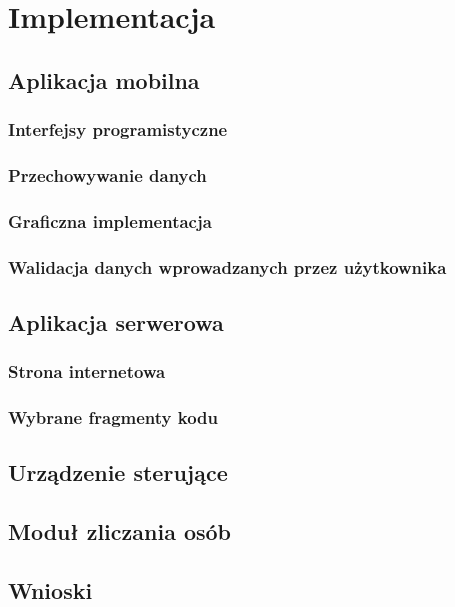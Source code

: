 \newpage\section{Implementacja} \label{sec:implementacja}
\subsection{Aplikacja mobilna}
	\subsubsection{Interfejsy programistyczne}
	\subsubsection{Przechowywanie danych}
	\subsubsection{Graficzna implementacja}
	\subsubsection{Walidacja danych wprowadzanych przez użytkownika}

\newpage
\subsection{Aplikacja serwerowa}
	\subsubsection{Strona internetowa}
	\subsubsection{Wybrane fragmenty kodu}

\newpage
\subsection{Urządzenie sterujące}

\newpage
\subsection{Moduł zliczania osób}

\newpage
\subsection{Wnioski}

